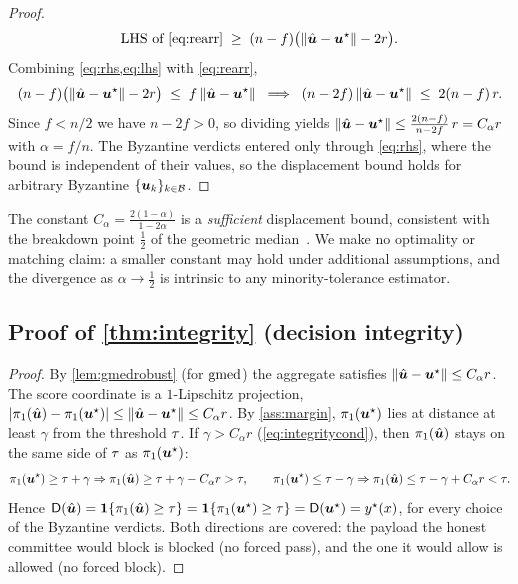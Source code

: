 \begin{proof}
\begin{equation}
  \text{LHS of \eqref{eq:rearr}} \;\ge\; (n-f)\bigl(\lVert\hat{\bm{u}}-\bm{u}^{\star}\rVert-2r\bigr).
  \label{eq:lhs}
\end{equation}
Combining \cref{eq:rhs,eq:lhs} with \cref{eq:rearr},
\begin{equation}
  (n-f)\bigl(\lVert\hat{\bm{u}}-\bm{u}^{\star}\rVert-2r\bigr)\;\le\; f\,\lVert\hat{\bm{u}}-\bm{u}^{\star}\rVert
  \;\;\Longrightarrow\;\;
  (n-2f)\,\lVert\hat{\bm{u}}-\bm{u}^{\star}\rVert \;\le\; 2(n-f)\,r .
\end{equation}
Since $f<n/2$ we have $n-2f>0$, so dividing yields
$\lVert\hat{\bm{u}}-\bm{u}^{\star}\rVert\le \frac{2(n-f)}{n-2f}\,r = C_\alpha r$ with
$\alpha=f/n$. The Byzantine verdicts entered only through \cref{eq:rhs}, where the bound is
independent of their values, so the displacement bound holds for arbitrary Byzantine
$\{\bm{u}_k\}_{k\in\mathcal{B}}$. \qedhere
\end{proof}

\begin{remark}
The constant $C_\alpha=\tfrac{2(1-\alpha)}{1-2\alpha}$ is a \emph{sufficient} displacement
bound, consistent with the breakdown point $\tfrac12$ of the geometric
median~\cite{lopuhaa1991breakdown,minsker2015geometric}. We make no optimality or matching
claim: a smaller constant may hold under additional assumptions, and the divergence as
$\alpha\to\tfrac12$ is intrinsic to any minority-tolerance estimator.
\end{remark}

\subsection{Proof of \cref{thm:integrity} (decision integrity)}
\begin{proof}
By \cref{lem:gmedrobust} (for $\operatorname{gmed}$) the aggregate satisfies
$\lVert\hat{\bm{u}}-\bm{u}^{\star}\rVert\le C_\alpha r$. The score coordinate is a $1$-Lipschitz
projection, $|\pi_1(\hat{\bm{u}})-\pi_1(\bm{u}^{\star})|\le\lVert\hat{\bm{u}}-\bm{u}^{\star}\rVert\le C_\alpha r$. By
\cref{ass:margin}, $\pi_1(\bm{u}^{\star})$ lies at distance at least $\gamma$ from the threshold
$\tau$. If $\gamma>C_\alpha r$ (\cref{eq:integritycond}), then $\pi_1(\hat{\bm{u}})$ stays on the
same side of $\tau$ as $\pi_1(\bm{u}^{\star})$:
\begin{equation}
  \pi_1(\bm{u}^{\star})\ge\tau+\gamma \Rightarrow \pi_1(\hat{\bm{u}})\ge \tau+\gamma-C_\alpha r>\tau,
  \qquad
  \pi_1(\bm{u}^{\star})\le\tau-\gamma \Rightarrow \pi_1(\hat{\bm{u}})\le \tau-\gamma+C_\alpha r<\tau .
\end{equation}
Hence $\mathsf{D}(\hat{\bm{u}})=\mathbf 1\{\pi_1(\hat{\bm{u}})\ge\tau\}=\mathbf 1\{\pi_1(\bm{u}^{\star})\ge\tau\}
=\mathsf{D}(\bm{u}^{\star})=y^\star(x)$, for every choice of the Byzantine verdicts. Both directions
are covered: the payload the honest committee would block is blocked (no forced pass), and
the one it would allow is allowed (no forced block). \qedhere
\end{proof}

